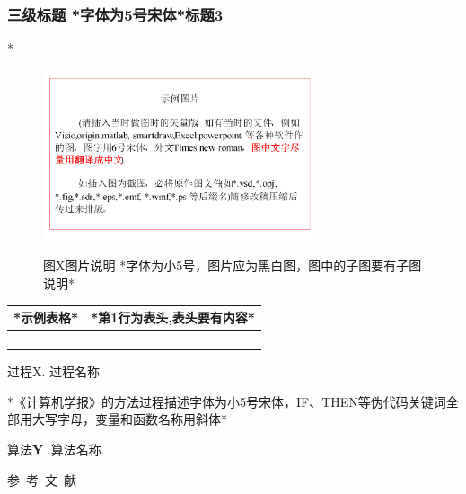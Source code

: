 \documentclass[10.5pt,compsoc]{CjC}
\theoremstyle{mystyle}
\begin{document}
\subsubsection{三级标题 *字体为5号宋体*标题3}
*
\begin{figure}[htbp]
\centerline{\includegraphics[width=3.15in,height=1.98in]{CJC1.pdf}}
图X\quad  图片说明 *字体为小5号，图片应为黑白图，图中的子图要有子图说明*
\label{fig1}
\end{figure}

\begin{table}[htbp]
\vspace {-2.5mm}
\begin{center}
\begin{tabular}{ll}
\toprule
*示例表格*&*第1行为表头,表头要有内容* \\
\hline
&
 \\
&
 \\
&
 \\
&
 \\
\bottomrule
\end{tabular}
\label{tab1}
\end{center}
\end{table}

\heiti 过程X. \quad 过程名称

{*《计算机学报》的方法过程描述字体为小5号宋体，IF、THEN等伪代码关键词全部用大写字母，变量和函数名称用斜体*}


\heiti 算法\textbf{Y} .\quad 算法名称.

\vspace {3mm}


\vspace {5mm}
\centerline
{
\heiti 参~考~文~献 }
\end{document}
